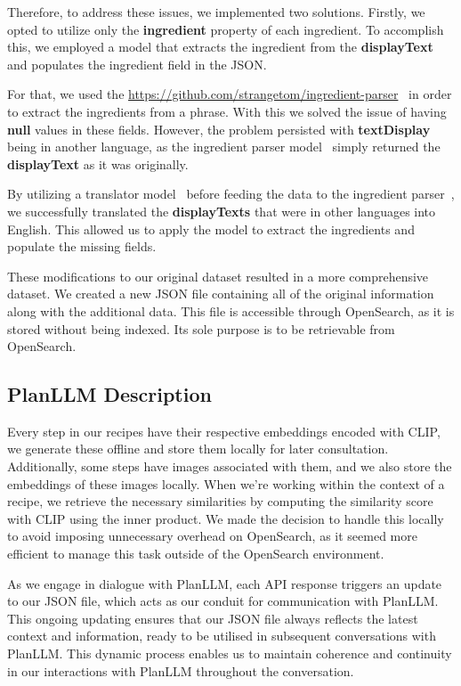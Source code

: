 \documentclass[runningheads]{llncs}
\begin{document}
Therefore, to address these issues, we implemented two solutions. Firstly, we opted to utilize only the \textbf{ingredient} property of each ingredient. To accomplish this, we employed a model that extracts the ingredient from the \textbf{displayText} and populates the ingredient field in the JSON.

For that, we used the \url{https://github.com/strangetom/ingredient-parser}~\cite{ingredientParser} in order to extract the ingredients from a phrase. With this we solved the issue of having \textbf{null} values in these fields. However, the problem persisted with \textbf{textDisplay} being in another language, as the ingredient parser model~\cite{ingredientParser} simply returned the \textbf{displayText} as it was originally.

By utilizing a translator model~\cite{deeptranslate} before feeding the data to the ingredient parser~\cite{ingredientParser}, we successfully translated the \textbf{displayTexts} that were in other languages into English. This allowed us to apply the model to extract the ingredients and populate the missing fields.

These modifications to our original dataset resulted in a more comprehensive dataset. We created a new JSON file containing all of the original information along with the additional data. This file is accessible through OpenSearch, as it is stored without being indexed. Its sole purpose is to be retrievable from OpenSearch.

\subsection{PlanLLM Description}
Every step in our recipes have their respective embeddings encoded with CLIP, we generate these offline and store them locally for later consultation. Additionally, some steps have images associated with them, and we also store the embeddings of these images locally. When we're working within the context of a recipe, we retrieve the necessary similarities by computing the similarity score with CLIP using the inner product. We made the decision to handle this locally to avoid imposing unnecessary overhead on OpenSearch, as it seemed more efficient to manage this task outside of the OpenSearch environment.

As we engage in dialogue with PlanLLM, each API response triggers an update to our JSON file, which acts as our conduit for communication with PlanLLM. This ongoing updating ensures that our JSON file always reflects the latest context and information, ready to be utilised in subsequent conversations with PlanLLM. This dynamic process enables us to maintain coherence and continuity in our interactions with PlanLLM throughout the conversation.
\end{document}
